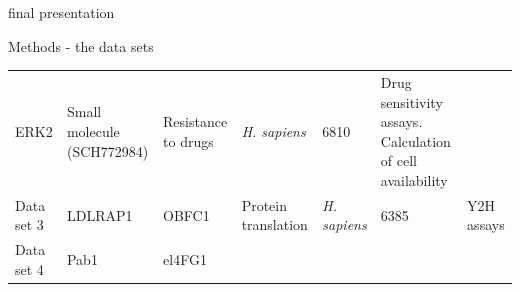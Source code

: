\documentclass[ignorenonframetext,]{beamer}
\begin{document}
\begin{frame}{final presentation}
\begin{block}{Methods - the data sets}
\begin{longtable}[]{@{}lllllll@{}}
\begin{minipage}[t]{0.04\columnwidth}
ERK2\strut
\end{minipage} & \begin{minipage}[t]{0.14\columnwidth}\raggedright
Small molecule (SCH772984)\strut
\end{minipage} & \begin{minipage}[t]{0.12\columnwidth}\raggedright
Resistance to drugs\strut
\end{minipage} & \begin{minipage}[t]{0.08\columnwidth}\raggedright
\emph{H. sapiens}\strut
\end{minipage} & \begin{minipage}[t]{0.08\columnwidth}\raggedright
6810\strut
\end{minipage} & \begin{minipage}[t]{0.30\columnwidth}\raggedright
Drug sensitivity assays. Calculation of cell availability\strut
\end{minipage}\tabularnewline
\begin{minipage}[t]{0.05\columnwidth}\raggedright
Data set 3\strut
\end{minipage} & \begin{minipage}[t]{0.04\columnwidth}\raggedright
LDLRAP1\strut
\end{minipage} & \begin{minipage}[t]{0.14\columnwidth}\raggedright
OBFC1\strut
\end{minipage} & \begin{minipage}[t]{0.12\columnwidth}\raggedright
Protein translation\strut
\end{minipage} & \begin{minipage}[t]{0.08\columnwidth}\raggedright
\emph{H. sapiens}\strut
\end{minipage} & \begin{minipage}[t]{0.08\columnwidth}\raggedright
6385\strut
\end{minipage} & \begin{minipage}[t]{0.30\columnwidth}\raggedright
Y2H assays\strut
\end{minipage}\tabularnewline
\begin{minipage}[t]{0.05\columnwidth}\raggedright
Data set 4\strut
\end{minipage} & \begin{minipage}[t]{0.04\columnwidth}\raggedright
Pab1\strut
\end{minipage} & \begin{minipage}[t]{0.14\columnwidth}\raggedright
el4FG1\strut
\end{minipage} & \begin{minipage}[t]{0.12\columnwidth}\raggedright

\end{minipage}
\end{longtable}
\end{block}
\end{frame}
\end{document}
